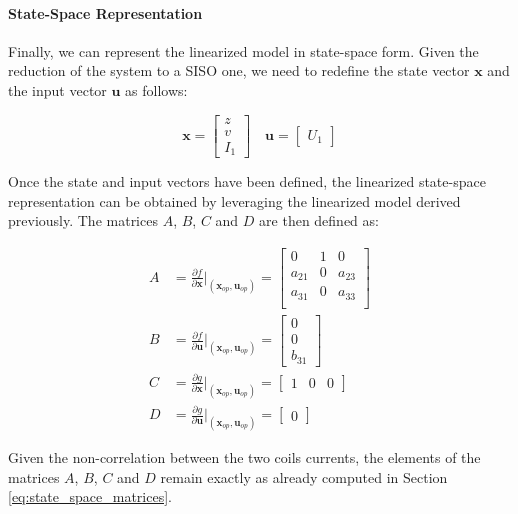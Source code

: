 \paragraph{State-Space Representation}

Finally, we can represent the linearized model in state-space form.
Given the reduction of the system to a SISO one, we need to redefine the state vector $\mathbf{x}$ and the input vector $\mathbf{u}$ as follows:

\begin{equation}
    \mathbf{x} = \begin{bmatrix}
        z \\
        v \\
        I_1
    \end{bmatrix}
    \quad
    \mathbf{u} = \begin{bmatrix}
        U_1
    \end{bmatrix}
\end{equation}


Once the state and input vectors have been defined, the linearized state-space representation can be obtained by leveraging the linearized model derived previously.
The matrices $A$, $B$, $C$ and $D$ are then defined as:

\begin{equation}
    \begin{aligned}
        A & = \frac{\partial f}{\partial \mathbf{x}} \Bigg|_{(\mathbf{x}_{op}, \mathbf{u}_{op})}
        = \begin{bmatrix}
              0      & 1 & 0      \\
              a_{21} & 0 & a_{23} \\
              a_{31} & 0 & a_{33} \\
          \end{bmatrix}                                                                    \\
        B & = \frac{\partial f}{\partial \mathbf{u}} \Bigg|_{(\mathbf{x}_{op}, \mathbf{u}_{op})}
        = \begin{bmatrix}
              0 \\
              0 \\
              b_{31}
          \end{bmatrix}                                                                         \\
        C & = \frac{\partial g}{\partial \mathbf{x}} \Bigg|_{(\mathbf{x}_{op}, \mathbf{u}_{op})}
        = \begin{bmatrix}
              1 & 0 & 0
          \end{bmatrix}                                                                         \\
        D & = \frac{\partial g}{\partial \mathbf{u}} \Bigg|_{(\mathbf{x}_{op}, \mathbf{u}_{op})}
        = \begin{bmatrix}
              0
          \end{bmatrix}
    \end{aligned}
\end{equation}

Given the non-correlation between the two coils currents, the elements of the matrices $A$, $B$, $C$ and $D$ remain exactly as already computed in Section \ref{eq:state_space_matrices}.